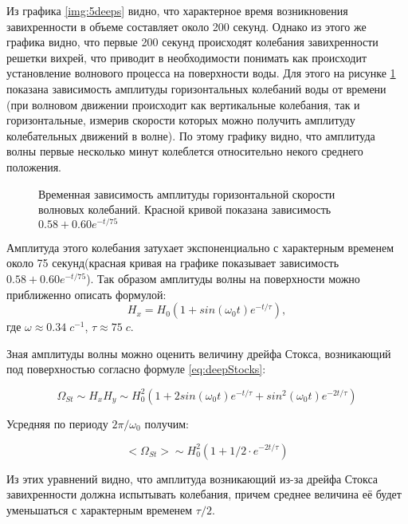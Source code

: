 Из графика \ref{img:5deeps} видно, что характерное время возникновения завихренности в объеме составляет около 200 секунд. Однако из этого же графика видно, что первые 200 секунд происходят колебания завихренности решетки вихрей, что приводит в необходимости понимать как происходит установление волнового процесса на поверхности воды. Для этого на рисунке \ref{img:amplVx} показана зависимость амплитуды горизонтальных колебаний воды от времени (при волновом движении происходит как вертикальные колебания, так и горизонтальные, измерив скорости которых можно получить амплитуду колебательных движений в волне). По этому графику видно, что амплитуда волны первые несколько минут колеблется относительно некого среднего положения.

\begin{figure}[ht]

    \caption{Временная зависимость амплитуды горизонтальной скорости волновых колебаний. Красной кривой показана зависимость $0.58+0.60 e^{-t/75}$}
  \label{img:amplVx}  
\end{figure}

 Амплитуда этого колебания затухает экспоненциально с характерным временем около 75 секунд(красная кривая на графике показывает зависимость $0.58+0.60 e^{-t/75}$). Так образом амплитуды волны на поверхности можно приближенно описать формулой:
\begin{equation}
 \label{eq:AmplVx}
	H_x = H_0 (1+sin(\omega_0 t) e^{-t/\tau}),
\end{equation}
где $\omega \approx 0.34 \; c^{-1}$, $\tau \approx 75 \; c$.


Зная амплитуды волны можно оценить величину дрейфа Стокса, возникающий под поверхностью согласно формуле \ref{eq:deepStocks}:

\begin{equation}
 \label{eq:partStocks}
	\Omega_{St} \sim H_x H_y \sim H^2_0 (1 + 2sin(\omega_0 t) e^{-t/\tau} + sin^2(\omega_0 t) e^{-2t/\tau})
\end{equation}

Усредняя по периоду $2\pi/\omega_0$ получим:

\begin{equation}
 \label{eq:partMeanStocks}
	<\Omega_{St}> \sim H^2_0 (1 + 1/2 \cdot e^{-2t/\tau})
\end{equation}

Из этих уравнений видно, что амплитуда возникающий из-за дрейфа Стокса завихренности должна испытывать колебания, причем среднее величина её будет уменьшаться с характерным временем $\tau/2$.

